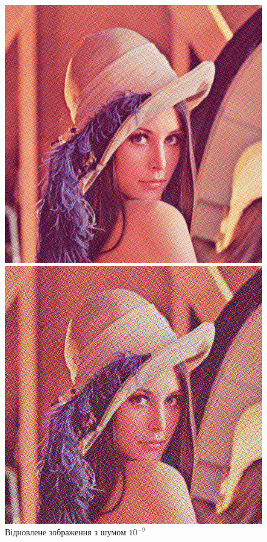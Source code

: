 \documentclass{diploma}
\begin{document}
\begin{figure}[htb]
          \includegraphics[width=\linewidth]{Lenna-b1e-9deconv.png}
          \caption{Відновлене зображення з шумом $10^{-9}$}\label{fig:Lenna-b1e-9deconv}
        \endminipage\hfill
          \includegraphics[width=\linewidth]{Lenna-b5e-9deconv.png}

\end{figure}
\end{document}
